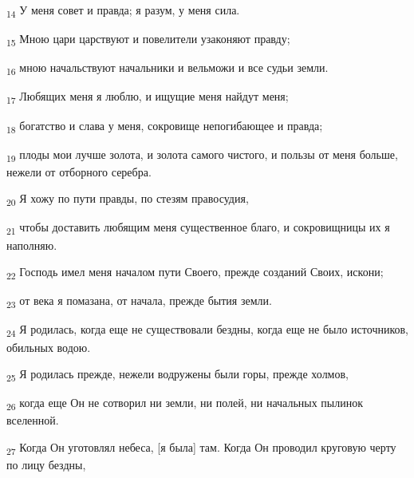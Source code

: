 \begin{tcolorbox}
\textsubscript{14} У меня совет и правда; я разум, у меня сила.
\end{tcolorbox}
\begin{tcolorbox}
\textsubscript{15} Мною цари царствуют и повелители узаконяют правду;
\end{tcolorbox}
\begin{tcolorbox}
\textsubscript{16} мною начальствуют начальники и вельможи и все судьи земли.
\end{tcolorbox}
\begin{tcolorbox}
\textsubscript{17} Любящих меня я люблю, и ищущие меня найдут меня;
\end{tcolorbox}
\begin{tcolorbox}
\textsubscript{18} богатство и слава у меня, сокровище непогибающее и правда;
\end{tcolorbox}
\begin{tcolorbox}
\textsubscript{19} плоды мои лучше золота, и золота самого чистого, и пользы от меня больше, нежели от отборного серебра.
\end{tcolorbox}
\begin{tcolorbox}
\textsubscript{20} Я хожу по пути правды, по стезям правосудия,
\end{tcolorbox}
\begin{tcolorbox}
\textsubscript{21} чтобы доставить любящим меня существенное благо, и сокровищницы их я наполняю.
\end{tcolorbox}
\begin{tcolorbox}
\textsubscript{22} Господь имел меня началом пути Своего, прежде созданий Своих, искони;
\end{tcolorbox}
\begin{tcolorbox}
\textsubscript{23} от века я помазана, от начала, прежде бытия земли.
\end{tcolorbox}
\begin{tcolorbox}
\textsubscript{24} Я родилась, когда еще не существовали бездны, когда еще не было источников, обильных водою.
\end{tcolorbox}
\begin{tcolorbox}
\textsubscript{25} Я родилась прежде, нежели водружены были горы, прежде холмов,
\end{tcolorbox}
\begin{tcolorbox}
\textsubscript{26} когда еще Он не сотворил ни земли, ни полей, ни начальных пылинок вселенной.
\end{tcolorbox}
\begin{tcolorbox}
\textsubscript{27} Когда Он уготовлял небеса, [я была] там. Когда Он проводил круговую черту по лицу бездны,
\end{tcolorbox}
